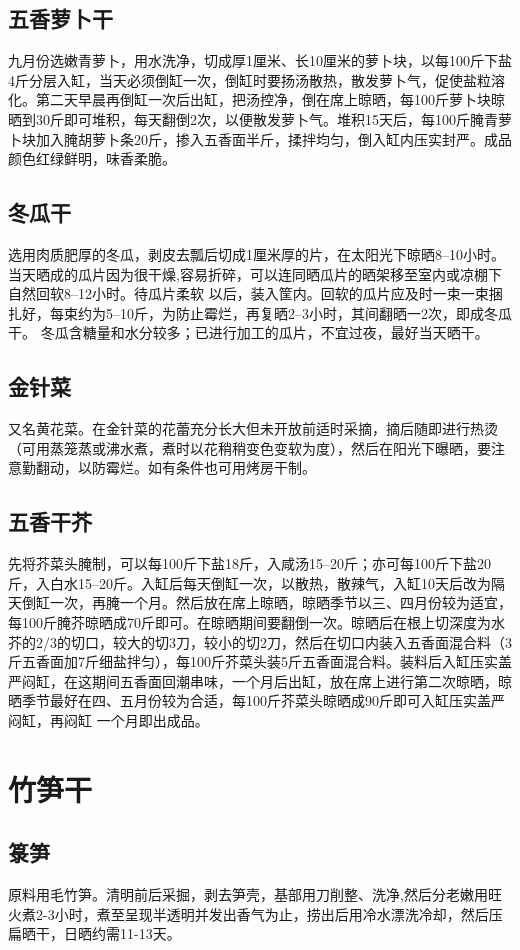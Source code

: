 \documentclass{ctexbook}
\begin{document}
\subsection{五香萝卜干}
九月份选嫩青萝卜，用水洗净，切成厚1厘米、长10厘米的萝卜块，以每100斤下盐4斤分层入缸，当天必须倒缸一次，倒缸时要扬汤散热，散发萝卜气，促使盐粒溶化。第二天早晨再倒缸一次后出缸，把汤控净，倒在席上晾晒，每100斤萝卜块晾晒到30斤即可堆积，每天翻倒2次，以便散发萝卜气。堆积15天后，每100斤腌青萝卜块加入腌胡萝卜条20斤，掺入五香面半斤，揉拌均匀，倒入缸内压实封严。成品颜色红绿鲜明，味香柔脆。
\subsection{冬瓜干}
选用肉质肥厚的冬瓜，剥皮去瓢后切成1厘米厚的片，在太阳光下晾晒8--10小时。当天晒成的瓜片因为很干燥,容易折碎，可以连同晒瓜片的晒架移至室内或凉棚下自然回软8--12小时。待瓜片柔软
以后，装入筐内。回软的瓜片应及时一束一束捆扎好，每束约为5--10斤，为防止霉烂，再复晒2--3小时，其间翻晒一2次，即成冬瓜干。
冬瓜含糖量和水分较多；已进行加工的瓜片，不宜过夜，最好当天晒干。
\subsection{金针菜}
又名黄花菜。在金针菜的花蕾充分长大但未开放前适时采摘，摘后随即进行热烫（可用蒸笼蒸或沸水煮，煮时以花稍稍变色变软为度），然后在阳光下曝晒，要注意勤翻动，以防霉烂。如有条件也可用烤房干制。
\subsection{五香干芥}
先将芥菜头腌制，可以每100斤下盐18斤，入咸汤15--20斤；亦可每100斤下盐20斤，入白水15--20斤。入缸后每天倒缸一次，以散热，散辣气，入缸10天后改为隔天倒缸一次，再腌一个月。然后放在席上晾晒，晾晒季节以三、四月份较为适宜，每100斤腌芥晾晒成70斤即可。在晾晒期间要翻倒一次。晾晒后在根上切深度为水芥的2/3的切口，较大的切3刀，较小的切2刀，然后在切口内装入五香面混合料（3斤五香面加7斤细盐拌匀），每100斤芥菜头装5斤五香面混合料。装料后入缸压实盖严闷缸，在这期间五香面回潮串味，一个月后出缸，放在席上进行第二次晾晒，晾晒季节最好在四、五月份较为合适，每100斤芥菜头晾晒成90斤即可入缸压实盖严闷缸，再闷缸
一个月即出成品。
\section{竹笋干}
\subsection{箓笋}
原料用毛竹笋。清明前后采掘，剥去笋壳，基部用刀削整、洗净,然后分老嫩用旺火煮2-3小时，煮至呈现半透明并发出香气为止，捞出后用冷水漂洗冷却，然后压扁晒干，日晒约需11-13天。
\end{document}
